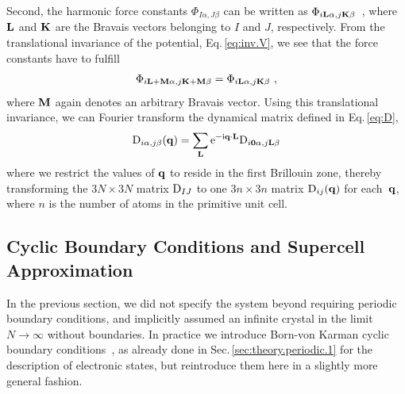 Second, the harmonic force constants $\Phi_{I \alpha, J \beta}$ can be written as $\Phi_{i {\bf L} \alpha, j {\bf K} \beta}$~, where $\bf L$ and ${\bf K}$ are the Bravais vectors belonging to $I$ and $J$, respectively. From the translational invariance of the potential, Eq.\,\eqref{eq:inv.V}, we see that the force constants have to fulfill
\begin{align}
	\Phi_{i {\bf L} + \b M \alpha, j {\bf K} + \b M \beta} 
		= \Phi_{i {\bf L} \alpha, j {\bf K} \beta}~,
	\label{eq:fc.sym.1}
\end{align}
where ${\bf M}$ again denotes an arbitrary Bravais vector. Using this translational invariance, we can Fourier transform the dynamical matrix defined in Eq.\,\eqref{eq:D},
\begin{align}
	{\rm D}_{i \alpha, j \beta} (\b q) 
		= \sum_{\b L} {\rm e}^{- \im \b q \cdot \b L} {\rm D}_{i \b 0 \alpha, j \b L \beta}
	\label{eq:D(q)}
\end{align}
where we restrict the values of ${\bf q}$ to reside in the first Brillouin zone, thereby transforming the $3N \times 3N$ matrix ${\rm D}_{IJ}$ to one $3n \times 3n$ matrix ${\rm D}_{ij} (\bf q)$ for each~${\bf q}$, where $n$ is the number of atoms in the primitive unit cell.

\subsection{Cyclic Boundary Conditions and Supercell Approximation}
In the previous section, we did not specify the system beyond requiring periodic boundary conditions, and implicitly assumed an infinite crystal in the limit $N \to \infty$ without boundaries. In practice we introduce Born-von Karman cyclic boundary conditions~\cite{born2013atomtheorie}, as already done in Sec.\,\ref{sec:theory.periodic.1} for the description of electronic states, but reintroduce them here in a slightly more general fashion.

